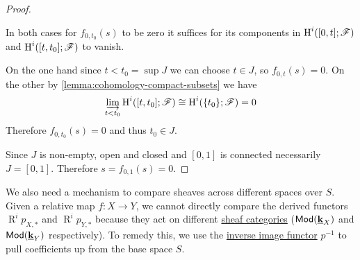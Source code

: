 \documentclass[../../main]{subfiles}
\begin{document}
\begin{proof}
\begin{itemize}
          In both cases for \(f_{0, t_{0}}(s)\) to be zero it suffices for its components in \(\operatorname{H}^{i}([0, t]; \mathscr{F})\) and \(\operatorname{H}^{i}([t, t_{0}]; \mathscr{F})\) to vanish.

          On the one hand since \(t < t_{0} = \operatorname{sup} J\) we can choose \(t \in J\), so \(f_{0, t}(s) = 0\).
          On the other by \autoref{lemma:cohomology-compact-subsets} we have
          \begin{equation*}
            \varinjlim_{t < t_{0}} \operatorname{H}^{i}([t, t_{0}]; \mathscr{F}) \cong \operatorname{H}^{i}(\{t_{0}\}; \mathscr{F}) = 0
          \end{equation*}
          Therefore \(f_{0, t_{0}}(s) = 0\) and thus \(t_{0} \in J\).
  \end{itemize}

  Since \(J\) is non-empty, open and closed and \([0, 1]\) is connected necessarily \(J = [0, 1]\).
  Therefore \(s = f_{0, 1}(s) = 0\).
\end{proof}

We also need a mechanism to compare sheaves across different spaces over \(S\).
Given a relative map \(f: X \to Y\), we cannot directly compare the derived functors \(\operatorname{R}^i p_{X,*}\) and \(\operatorname{R}^i p_{Y,*}\) because they act on different \hyperref[def:sheaf]{sheaf categories} (\(\mathsf{Mod}(\underline{\mathbf{k}}_X)\) and \(\mathsf{Mod}(\underline{\mathbf{k}}_Y)\) respectively).
To remedy this, we use the \hyperref[def:inverse-image-sheaf]{inverse image functor} \(p^{-1}\) to pull coefficients up from the base space \(S\).
\end{document}
